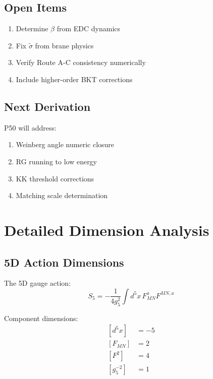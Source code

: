 \documentclass[11pt,a4paper]{article}
\begin{document}
\subsection{Open Items}
\label{app:open-items}

\begin{enumerate}
\item Determine $\beta$ from EDC dynamics
\item Fix $\tilde{\sigma}$ from brane physics
\item Verify Route A-C consistency numerically
\item Include higher-order BKT corrections
\end{enumerate}

\subsection{Next Derivation}
\label{app:next}

P50 will address:
\begin{enumerate}
\item Weinberg angle numeric closure
\item RG running to low energy
\item KK threshold corrections
\item Matching scale determination
\end{enumerate}

\section{Detailed Dimension Analysis}
\label{app:dim-details}

\subsection{5D Action Dimensions}
\label{app:5d-action-dim}

The 5D gauge action:
\begin{equation}
\label{eq:5d-gauge-action}
S_5 = -\frac{1}{4g_5^2} \int d^5x \, F_{MN}^a F^{MN,a}
\end{equation}

Component dimensions:
\begin{align}
\label{eq:dim-d5x}
[d^5x] &= -5 \\
\label{eq:dim-fmn}
[F_{MN}] &= 2 \\
\label{eq:dim-f2-detail}
[F^2] &= 4 \\
\label{eq:dim-g5-inv}
[g_5^{-2}] &= 1
\end{align}
\end{document}
